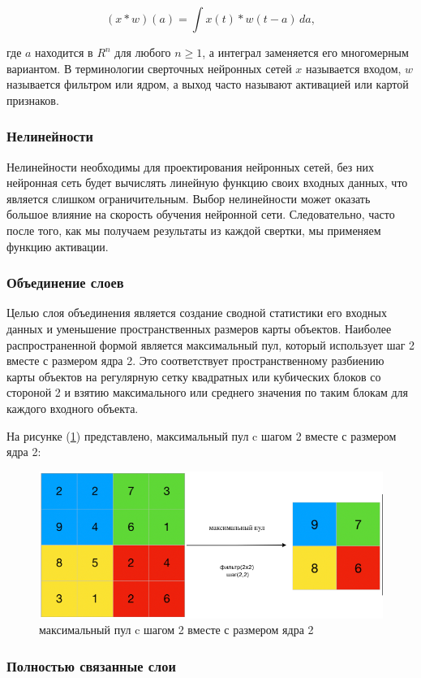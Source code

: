 \begin{equation}
    (x * w)(a) = \int x(t) * w (t - a) \, da
, \end{equation}

где \(a\) находится в \(R^{n}\) для любого \(n \ge 1\), а интеграл заменяется его многомерным вариантом. В терминологии сверточных нейронных сетей \(x\) называется входом, \(w\) называется фильтром или ядром, а выход часто называют активацией или картой признаков.

\subsubsection*{Нелинейности}

Нелинейности необходимы для проектирования нейронных сетей, без них нейронная сеть будет вычислять линейную функцию своих входных данных, что является слишком ограничительным. Выбор нелинейности может оказать большое влияние на скорость обучения нейронной сети. Следовательно, часто после того, как мы получаем результаты из каждой свертки, мы применяем функцию активации.

\subsubsection*{Объединение слоев}

Целью слоя объединения является создание сводной статистики его входных данных и уменьшение пространственных размеров карты объектов. Наиболее распространенной формой является максимальный пул, который использует шаг 2 вместе с размером ядра 2. Это соответствует пространственному разбиению карты объектов на регулярную сетку квадратных или кубических блоков со стороной 2 и взятию максимального или среднего значения по таким блокам для каждого входного объекта.

На рисунке (\ref{fig:max-pool}) представлено, максимальный пул c шагом 2 вместе с размером ядра 2: 
\begin{figure}[H]
	\centering
	\includegraphics[width=0.4\linewidth]{assets/max-pooling.png}
	\caption{максимальный пул c шагом 2 вместе с размером ядра 2}
	\label{fig:max-pool}
\end{figure}

\subsubsection*{Полностью связанные слои}

